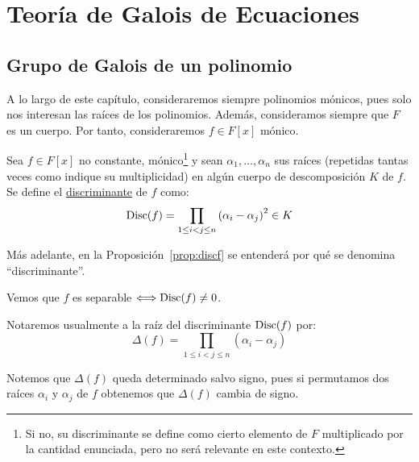 \chapter{Teoría de Galois de Ecuaciones}
\section{Grupo de Galois de un polinomio}

A lo largo de este capítulo, consideraremos siempre polinomios mónicos, pues solo nos interesan las raíces de los polinomios. Además, consideramos siempre que $F$ es un cuerpo. Por tanto, consideraremos $f\in F[x]$ mónico.

\begin{definicion} %
    Sea $f\in F[x]$ no constante, mónico\footnote{Si no, su discriminante se define como cierto elemento de $F$ multiplicado por la cantidad enunciada, pero no será relevante en este contexto.} y sean $\alpha_1, \ldots, \alpha_n$ sus raíces (repetidas tantas veces como indique su multiplicidad) en algún cuerpo de descomposición $K$ de $f$. Se define el \underline{discriminante} de $f$ como:
    \begin{equation*}
        \operatorname{Disc}(f) = \prod_{1\leq i<j \leq n} {(\alpha_i-\alpha_j)}^{2} \in K
    \end{equation*}
\end{definicion}

Más adelante, en la Proposición~\ref{prop:discf} se entenderá por qué se denomina ``discriminante''.

\begin{observacion}
    Vemos que $f$ es separable $\Longleftrightarrow \operatorname{Disc}(f)\neq 0$. 
\end{observacion}

\begin{notacion}
    Notaremos usualmente a la raíz del discriminante $\operatorname{Disc}(f)$ por:
    \begin{equation*}
        \Delta(f) = \prod_{1\leq i < j \leq n}(\alpha_i-\alpha_j)
    \end{equation*}

    Notemos que $\Delta(f)$ queda determinado salvo signo, pues si permutamos dos raíces $\alpha_i$ y $\alpha_j$ de $f$ obtenemos que $\Delta(f)$ cambia de signo.
\end{notacion}

